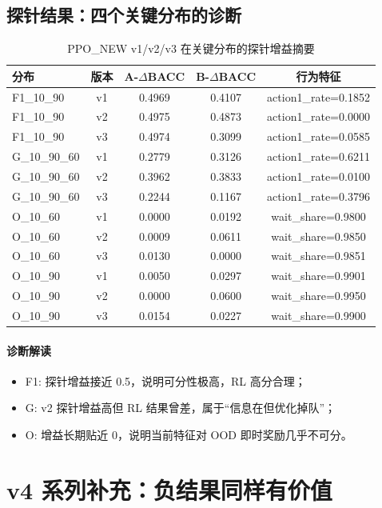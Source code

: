 ﻿\documentclass[11pt,a4paper]{ctexart}
\begin{document}
\subsection{探针结果：四个关键分布的诊断}
\begin{table}[H]
\centering
\caption{PPO\_NEW v1/v2/v3 在关键分布的探针增益摘要}
\begin{tabular}{lcccc}
\toprule
分布 & 版本 & A-$\Delta$BACC & B-$\Delta$BACC & 行为特征 \\
\midrule
F1\_10\_90 & v1 & 0.4969 & 0.4107 & action1\_rate=0.1852 \\
F1\_10\_90 & v2 & 0.4975 & 0.4873 & action1\_rate=0.0000 \\
F1\_10\_90 & v3 & 0.4974 & 0.3099 & action1\_rate=0.0585 \\
\midrule
G\_10\_90\_60 & v1 & 0.2779 & 0.3126 & action1\_rate=0.6211 \\
G\_10\_90\_60 & v2 & 0.3962 & 0.3833 & action1\_rate=0.0100 \\
G\_10\_90\_60 & v3 & 0.2244 & 0.1167 & action1\_rate=0.3796 \\
\midrule
O\_10\_60 & v1 & 0.0000 & 0.0192 & wait\_share=0.9800 \\
O\_10\_60 & v2 & 0.0009 & 0.0611 & wait\_share=0.9850 \\
O\_10\_60 & v3 & 0.0130 & 0.0000 & wait\_share=0.9851 \\
\midrule
O\_10\_90 & v1 & 0.0050 & 0.0297 & wait\_share=0.9901 \\
O\_10\_90 & v2 & 0.0000 & 0.0600 & wait\_share=0.9950 \\
O\_10\_90 & v3 & 0.0154 & 0.0227 & wait\_share=0.9900 \\
\bottomrule
\end{tabular}
\end{table}

\paragraph{诊断解读}
\begin{itemize}
  \item F1: 探针增益接近 0.5，说明可分性极高，RL 高分合理；
  \item G: v2 探针增益高但 RL 结果曾差，属于“信息在但优化掉队”；
  \item O: 增益长期贴近 0，说明当前特征对 OOD 即时奖励几乎不可分。
\end{itemize}

\section{v4 系列补充：负结果同样有价值}
\end{document}

